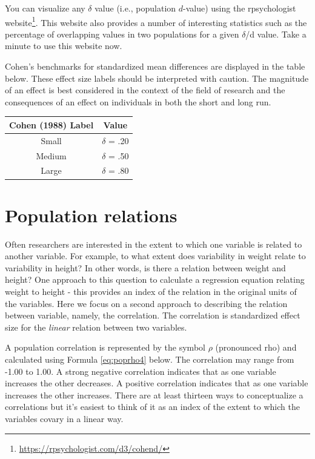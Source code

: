 \documentclass[
]{krantz}
\renewcommand{\href}[2]{#2\footnote{\url{#1}}}
\begin{document}
You can visualize any \(\delta\) value (i.e., population \(d\)-value) using the rpsychologist \href{https://rpsychologist.com/d3/cohend/}{website}. This website also provides a number of interesting statistics such as the percentage of overlapping values in two populations for a given \(\delta\)/d value. Take a minute to use this website now.

Cohen's benchmarks for standardized mean differences are displayed in the table below. These effect size labels should be interpreted with caution. The magnitude of an effect is best considered in the context of the field of research and the consequences of an effect on individuals in both the short and long run.

\begin{longtable}[]{@{}cc@{}}
\toprule
Cohen (1988) Label & Value \\
\midrule
\endhead
Small & \(\delta\) = .20 \\
Medium & \(\delta\) = .50 \\
Large & \(\delta\) = .80 \\
\bottomrule
\end{longtable}

\hypertarget{population-relations}{%
\section{Population relations}\label{population-relations}}

Often researchers are interested in the extent to which one variable is related to another variable. For example, to what extent does variability in weight relate to variability in height? In other words, is there a relation between weight and height? One approach to this question to calculate a regression equation relating weight to height - this provides an index of the relation in the original units of the variables. Here we focus on a second approach to describing the relation between variable, namely, the correlation. The correlation is standardized effect size for the \emph{linear} relation between two variables.

A population correlation is represented by the symbol \(\rho\) (pronounced rho) and calculated using Formula \eqref{eq:poprho4} below. The correlation may range from -1.00 to 1.00. A strong negative correlation indicates that as one variable increases the other decreases. A positive correlation indicates that as one variable increases the other increases. There are at least thirteen ways to conceptualize a correlations \citep[see][]{lee1988thirteen} but it's easiest to think of it as an index of the extent to which the variables covary in a linear way.
\end{document}
